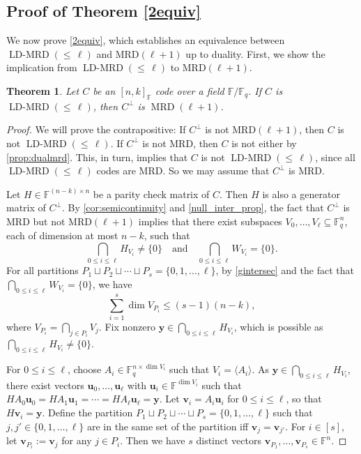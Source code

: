 \documentclass[11pt]{article}
\theoremstyle{plain}
\newtheorem{thm}{Theorem}[section]
\theoremstyle{definition}
\theoremstyle{remark}
\newcommand{\ldmrd}[1]{\operatorname{LD-MRD}({\leq}\,#1)}
\newcommand{\F}{\mathbb{F}}
\newcommand{\bv}{\bm{v}}
\newcommand{\bu}{\bm{u}}
\newcommand{\by}{\bm{y}}
\begin{document}
\subsection{Proof of Theorem \ref{2equiv}}

We now prove \cref{2equiv}, which establishes an equivalence between $\ldmrd{\ell}$ and $\mathrm{MRD}(\ell+1)$ up to duality. 
First, we show the implication from $\ldmrd{\ell}$ to $\mathrm{MRD}(\ell+1)$.

\begin{thm}\label{thm:ldmrd2mrd}
Let $C$ be an $[n,k]_{\F}$ code over a field $\F/\F_q$.
If $C$ is $\ldmrd{\ell}$, then $C^{\perp}$ is $\operatorname{MRD}(\ell+1)$.
\end{thm}

\begin{proof}
We will prove the contrapositive: If  $C^{\perp}$ is not MRD$(\ell+1)$, then $C$ is not $\ldmrd{\ell}$. 
If $C^{\perp}$ is not MRD, then $C$ is not either by \cref{prop:dualmrd}. This, in turn, implies that $C$ is not $\ldmrd{\ell}$, since all $\ldmrd{\ell}$ codes are MRD. 
So we may assume that $C^{\perp}$ is MRD.

Let $H\in \F^{(n-k)\times n}$ be a parity check matrix of $C$. Then $H$ is also a generator matrix of $C^{\perp}$. 
By \cref{cor:semicontinuity} and \cref{null_inter_prop}, the fact that $C^{\perp}$ is MRD but not MRD$(\ell+1)$ implies that there exist subspaces $V_0,\ldots,V_\ell\subseteq \F_q^n$, each of dimension at most $n-k$, such that 
\begin{equation}
\bigcap_{0\leq i\leq \ell} H_{V_i}\neq \{0\}\quad \text{and} \quad \bigcap_{0\leq i\leq \ell} W_{V_i}=\{0\}.
\end{equation}
For all partitions $P_1\sqcup P_2\sqcup\cdots\sqcup P_s=\{0,1,\ldots,\ell\}$, by \cref{gintersec} and the fact that $\bigcap_{0\leq i\leq \ell}W_{V_{i}}=\{0\}$, we have 
\begin{equation}\label{eq:sum-vpi}
\sum_{i=1}^s \dim V_{P_i}\leq (s-1)(n-k),
\end{equation}
where $V_{P_i}=\bigcap_{j\in P_i} V_j$. 
Fix nonzero $\by\in \bigcap_{0\leq i\leq \ell}H_{V_{i}}$, which is possible as $\bigcap_{0\leq i\leq \ell}H_{V_{i}}\neq \{0\}$.

For $0\leq i\leq \ell$, choose $A_i\in \F_q^{n\times \dim V_i}$ such that $V_i=\langle A_i\rangle$.
As $\by\in \bigcap_{0\leq i\leq \ell}H_{V_{i}}$,
there exist vectors $\bu_0,\dots,\bu_{\ell}$ with $\bu_i\in  \F^{\dim V_i}$ such that $H A_{0}\bu_0=H A_{1}\bu_1=\cdots=H A_{\ell}\bu_\ell=\by$.
Let $\bv_i=A_{i} \bu_i$ for $0\leq i\leq \ell$, so that $H\bv_i=\by$. 
Define the partition $P_1\sqcup P_2\sqcup\cdots\sqcup P_s=\{0,1,\ldots,\ell\}$ such that $j,j'\in\{0,1,\dots,\ell\}$ are in the same set of the partition iff $\bv_j=\bv_{j'}$. For $i\in [s]$, let $\bv_{P_i}:=\bv_j$ for any $j\in P_i$. Then we have $s$ distinct vectors $\bv_{P_1},\dots,\bv_{P_s}\in \F^n$.


\end{proof}
\end{document}
